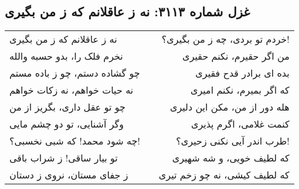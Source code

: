 \begin{center}
\section*{غزل شماره ۳۱۱۳: نه ز عاقلانم که ز من بگیری}
\label{sec:3113}
\begin{longtable}{l p{0.5cm} r}
نه ز عاقلانم که ز من بگیری
&&
خردم تو بردی، چه ز من بگیری؟!
\\
نخرم فلک را، بدو حسبه والله
&&
من اگر حقیرم، نکنم حقیری
\\
چو گشاده دستم، چو ز باده مستم
&&
بده ای برادر قدح فقیری
\\
نه حیات خواهم، نه زکات خواهم
&&
که اگر بمیرم، نکنم امیری
\\
چو تو عقل داری، بگریز از من
&&
هله دور از من، مکن این دلیری
\\
وگر آشنایی، تو دو چشم مایی
&&
کنمت غلامی، اگرم پذیری
\\
چه شود محمد! که شبی نخسبی؟!
&&
طرب اندر آیی نکنی زحیری؟!
\\
تو بیار ساقی! ز شراب باقی
&&
که لطیف خویی، و شه شهیری
\\
ز جفای مستان، نروی ز دستان
&&
که لطیف کیشی، نه چو زخم تیری
\\
\end{longtable}
\end{center}
